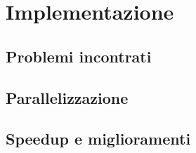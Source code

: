 \chapter*{Implementazione}

	\section*{Problemi incontrati}
	
	\section*{Parallelizzazione}
	
	\section*{Speedup e miglioramenti}

